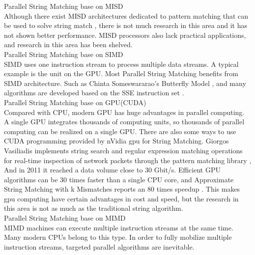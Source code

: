 \documentclass[11pt]{article}       %
\begin{document}
Parallel String Matching base on MISD\\
Although there exist MISD architectures dedicated to pattern matching that can be used to solve string match \cite{MISD}, there is not much research in this area and it has not shown better performance. MISD processors also lack practical applications, and research in this area has been shelved. \\

Parallel String Matching base on SIMD\\
SIMD uses one instruction stream to process multiple data streams. A typical example is the unit on the GPU. Most Parallel String Matching benefits from SIMD architecture. Such as Chinta Someswararao's Butterfly Model \cite{Butterfly}, and many algorithms are developed based on the SSE instruction set \cite{Matching}. \\

Parallel String Matching base on GPU(CUDA)\\
Compared with CPU, modern GPU has huge advantages in parallel computing. A single GPU integrates thousands of computing units, so thousands of parallel computing can be realized on a single GPU. There are also some ways to use CUDA programming provided by nVidia gpu for String Matching. Giorgos Vasiliadis implements string search and regular expression matching operations for real-time inspection of network packets through the pattern matching library \cite{Bit-Parallel}, And in 2011 it reached a data volume close to 30 Gbit/s. Efficient GPU algorithms can be 30 times faster than a single CPU core, and Approximate String Matching with k Mismatches reports an 80 times speedup \cite{pattern-matching}. This makes gpu computing have certain advantages in cost and speed, but the research in this area is not as much as the traditional string algorithm. \\

Parallel String Matching base on MIMD\\
MIMD machines can execute multiple instruction streams at the same time. Many modern CPUs belong to this type. In order to fully mobilize multiple instruction streams, targeted parallel algorithms are inevitable. \\
\end{document}

